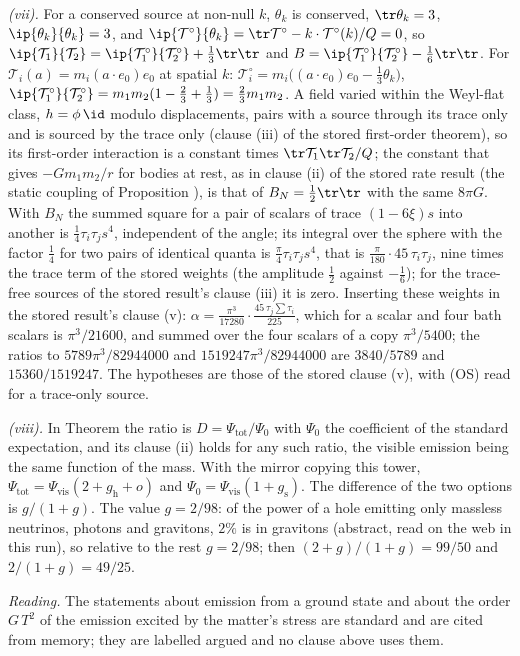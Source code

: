 \emph{(vii).} For a conserved source at non-null $k$, $\theta_{k}$ is conserved, $\tr\theta_{k} = 3$, $\ip{\theta_{k}}{\theta_{k}} = 3$, and $\ip{\mathcal{T}^{\circ}}{\theta_{k}} = \tr\mathcal{T}^{\circ} - k \cdot \mathcal{T}^{\circ}(k)/Q = 0$, so $\ip{\mathcal{T}_{1}}{\mathcal{T}_{2}} = \ip{\mathcal{T}_{1}^{\circ}}{\mathcal{T}_{2}^{\circ}} + \tfrac13\tr\tr$ and $B = \ip{\mathcal{T}_{1}^{\circ}}{\mathcal{T}_{2}^{\circ}} - \tfrac16\tr\tr$. For $\mathcal{T}_{i}(a) = m_{i}(a \cdot e_{0})e_{0}$ at spatial $k$: $\mathcal{T}^{\circ}_{i} = m_{i}\bigl((a \cdot e_{0})e_{0} - \tfrac13\theta_{k}\bigr)$, $\ip{\mathcal{T}_{1}^{\circ}}{\mathcal{T}_{2}^{\circ}} = m_{1}m_{2}(1 - \tfrac23 + \tfrac13) = \tfrac23 m_{1}m_{2}$. A field varied within the Weyl-flat class, $h = \phi\,\id$ modulo displacements, pairs with a source through its trace only and is sourced by the trace only (clause (iii) of the stored first-order theorem), so its first-order interaction is a constant times $\tr\mathcal{T}_{1}\tr\mathcal{T}_{2}/Q$; the constant that gives $-Gm_{1}m_{2}/r$ for bodies at rest, as in clause (ii) of the stored rate result (the static coupling of Proposition ), is that of $B_{N} = \tfrac12\tr\tr$ with the same $8\pi G$. With $B_{N}$ the summed square for a pair of scalars of trace $(1 - 6\xi)s$ into another is $\tfrac14\tau_{i}\tau_{j}s^{4}$, independent of the angle; its integral over the sphere with the factor $\tfrac14$ for two pairs of identical quanta is $\tfrac{\pi}{4}\tau_{i}\tau_{j}s^{4}$, that is $\tfrac{\pi}{180}\cdot 45\,\tau_{i}\tau_{j}$, nine times the trace term of the stored weights (the amplitude $\tfrac12$ against $-\tfrac16$); for the trace-free sources of the stored result's clause (iii) it is zero. Inserting these weights in the stored result's clause (v): $\alpha = \tfrac{\pi^{3}}{17280}\cdot\tfrac{45\,\tau_{j}\sum\tau_{i}}{225}$, which for a scalar and four bath scalars is $\pi^{3}/21600$, and summed over the four scalars of a copy $\pi^{3}/5400$; the ratios to $5789\pi^{3}/82944000$ and $1519247\pi^{3}/82944000$ are $3840/5789$ and $15360/1519247$. The hypotheses are those of the stored clause (v), with (OS) read for a trace-only source.

\emph{(viii).} In Theorem  the ratio is $D = \Psi_{\mathrm{tot}}/\Psi_{0}$ with $\Psi_{0}$ the coefficient of the standard expectation, and its clause (ii) holds for any such ratio, the visible emission being the same function of the mass. With the mirror copying this tower, $\Psi_{\mathrm{tot}} = \Psi_{\mathrm{vis}}(2 + g_{\mathrm{h}} + o)$ and $\Psi_{0} = \Psi_{\mathrm{vis}}(1 + g_{\mathrm{s}})$. The difference of the two options is $g/(1 + g)$. The value $g = 2/98$: of the power of a hole emitting only massless neutrinos, photons and gravitons, $2\%$ is in gravitons \cite{Page1976} (abstract, read on the web in this run), so relative to the rest $g = 2/98$; then $(2 + g)/(1 + g) = 99/50$ and $2/(1 + g) = 49/25$.

\emph{Reading.} The statements about emission from a ground state and about the order $G\,T^{2}$ of the emission excited by the matter's stress are standard and are cited from memory; they are labelled argued and no clause above uses them.

